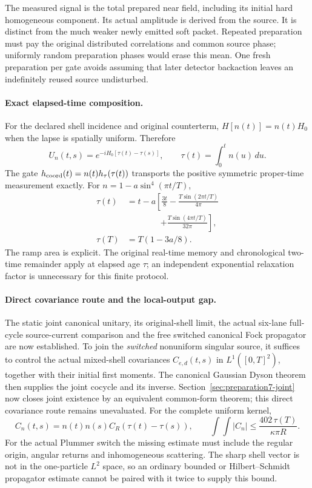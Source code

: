 The measured signal is the total prepared near field, including its
initial hard homogeneous component. Its actual amplitude is derived from
the source. It is distinct from the much weaker newly emitted soft
packet. Repeated preparation must pay the original distributed correlations
and common source phase; uniformly random preparation phases would erase
this mean. One fresh preparation per gate avoids assuming that later
detector backaction leaves an indefinitely reused source undisturbed.

\paragraph{Exact elapsed-time composition.}
For the declared shell incidence and original counterterm,
$H[n(t)]=n(t)H_0$ when the lapse is spatially uniform. Therefore
\begin{equation}
 U_n(t,s)=e^{-iH_0[\tau(t)-\tau(s)]},\qquad
 \tau(t)=\int_0^t n(u)\,du.
\end{equation}
The gate $h_{\rm coord}(t)=n(t)h_\tau(\tau(t))$ transports the positive
symmetric proper-time measurement exactly. For $n=1-a\sin^4(\pi t/T)$,
\begin{align}
 \tau(t)&=t-a\left[\frac{3t}{8}
 -\frac{T\sin(2\pi t/T)}{4\pi}\right.\nonumber\\
 &\hspace{4em}\left.+\frac{T\sin(4\pi t/T)}{32\pi}\right],\\
 \tau(T)&=T(1-3a/8).
\end{align}
The ramp area is explicit. The original real-time memory and chronological
two-time remainder apply at elapsed age $\tau$; an independent exponential
relaxation factor is unnecessary for this finite protocol.

\paragraph{Direct covariance route and the local-output gap.}
The static joint canonical unitary, its original-shell limit, the actual
six-lane full-cycle source-current comparison and the free switched
canonical Fock propagator are now established. To join the \emph{switched}
nonuniform singular source, it suffices to control the actual mixed-shell
covariances $C_{e,d}(t,s)$ in $L^1([0,T]^2)$, together with their initial
first moments. The canonical Gaussian Dyson theorem then supplies the
joint cocycle and its inverse. Section~\ref{sec:preparation7-joint} now closes joint existence by an equivalent common-form theorem; this direct covariance route remains unevaluated.
For the complete uniform kernel,
\begin{equation}
 C_n(t,s)=n(t)n(s)C_R(\tau(t)-\tau(s)),\qquad
 \int\!\!\int|C_n|\le\frac{402\,\tau(T)}{\kappa\pi R}.
\end{equation}
For the actual Plummer switch the missing estimate must include the
regular origin, angular returns and inhomogeneous scattering. The sharp
shell vector is not in the one-particle $L^2$ space, so an ordinary
bounded or Hilbert--Schmidt propagator estimate cannot be paired with it
twice to supply this bound.

